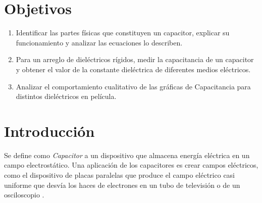 \documentclass[letterpaper, 11 pt]{article}
\begin{document}
\begin{multicols}{2}

\section{Objetivos}
\begin{enumerate}
    \item Identificar las partes físicas que constituyen un capacitor, explicar su funcionamiento y analizar las ecuaciones lo describen.
    \item Para un arreglo de dieléctricos rígidos, medir la capacitancia de un capacitor y obtener el valor de la constante dieléctrica de diferentes medios eléctricos. 
    \item Analizar el comportamiento cualitativo de las gráficas de Capacitancia para distintos dieléctricos en película. %
\end{enumerate}

\section{Introducción}


Se define como \textit{Capacitor} a un dispositivo que almacena energía eléctrica en un campo electrostático. Una aplicación de los capacitores es crear campos eléctricos, como el dispositivo de placas paralelas que produce el campo eléctrico casi uniforme que desvía los haces de electrones en un tubo de televisión o de un osciloscopio \cite{resnik2002}.



\end{multicols}
\end{document}
